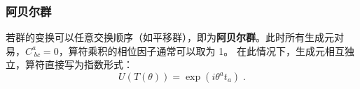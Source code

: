 \subsubsection*{阿贝尔群}
若群的变换可以任意交换顺序（如平移群），即为\textbf{阿贝尔群}。此时所有生成元对易，$C^a_{\; bc} = 0$，算符乘积的相位因子通常可以取为 1。
在此情况下，生成元相互独立，算符直接写为指数形式：
\begin{equation}
    U(T(\theta)) = \exp(i\theta^a t_a) \;.
\end{equation}


